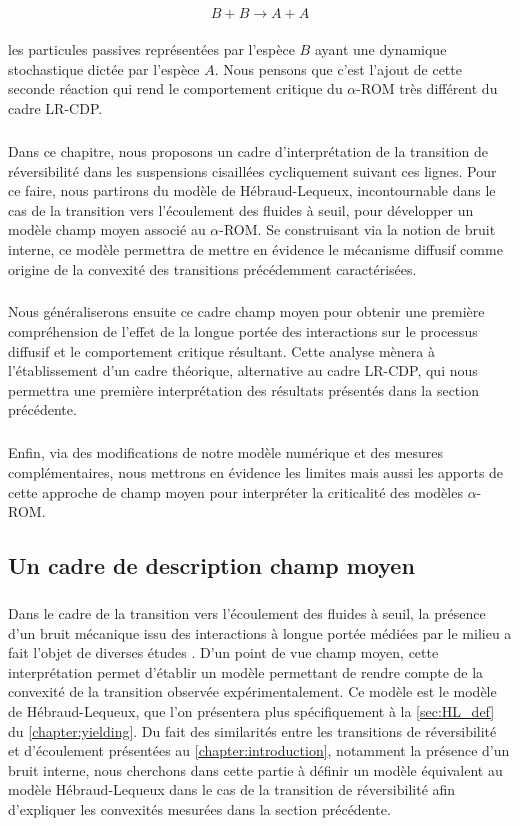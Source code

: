 \begin{equation}
	B +B \xrightarrow[]{} A + A
	\label{eq:meca_diff}
\end{equation}

\noindent les particules passives représentées par l'espèce $B$ ayant une dynamique stochastique dictée par l'espèce $A$. Nous pensons que c'est l'ajout de cette seconde réaction qui rend le comportement critique du $\alpha$-ROM très différent du cadre LR-CDP.

\subparagraph{}Dans ce chapitre, nous proposons un cadre d'interprétation de la transition de réversibilité dans les suspensions cisaillées cycliquement suivant ces lignes. Pour ce faire, nous partirons du modèle de Hébraud-Lequeux, incontournable dans le cas de la transition vers l'écoulement des fluides à seuil, pour développer un modèle champ moyen associé au $\alpha$-ROM. Se construisant via la notion de bruit interne, ce modèle permettra de mettre en évidence le mécanisme diffusif comme origine de la convexité des transitions précédemment caractérisées.

\subparagraph{}Nous généraliserons ensuite ce cadre champ moyen pour obtenir une première compréhension de  l'effet de la longue portée des interactions sur le processus diffusif et le comportement critique résultant. Cette analyse mènera à l'établissement d'un cadre théorique, alternative au cadre LR-CDP, qui nous permettra une première interprétation des résultats présentés dans la section précédente. 

\subparagraph{}Enfin, via des modifications de notre modèle numérique et des mesures complémentaires, nous mettrons en évidence les limites mais aussi les apports de cette approche de champ moyen pour interpréter la criticalité des modèles $\alpha$-ROM.

\subsection{Un cadre de description champ moyen}

\subparagraph{}Dans le cadre de la transition vers l'écoulement des fluides à seuil, la présence d'un bruit mécanique issu des interactions à longue portée médiées par le milieu a fait l'objet de diverses études \cite{lin_mean-field_2016, ferrero_criticality_2019}. D'un point de vue champ moyen, cette interprétation permet d'établir un modèle permettant de rendre compte de la convexité de la transition observée expérimentalement. Ce modèle est le modèle de Hébraud-Lequeux\cite{hebraud_mode-coupling_1998}, que l'on présentera plus spécifiquement à la \autoref{sec:HL_def} du \autoref{chapter:yielding}. Du fait des similarités entre les transitions de réversibilité et d'écoulement présentées au \autoref{chapter:introduction}, notamment la présence d'un bruit interne, nous cherchons dans cette partie à définir un modèle équivalent au modèle Hébraud-Lequeux dans le cas de la transition de réversibilité afin d'expliquer les convexités mesurées dans la section précédente.

